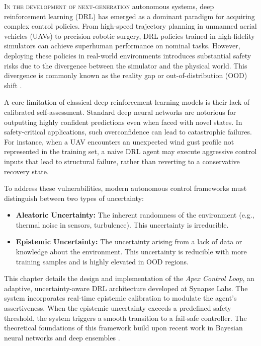 \lettrine{I}{n the development of next-generation} autonomous systems, deep reinforcement learning (DRL) has emerged as a dominant paradigm for acquiring complex control policies. From high-speed trajectory planning in unmanned aerial vehicles (UAVs) to precision robotic surgery, DRL policies trained in high-fidelity simulators can achieve superhuman performance on nominal tasks. However, deploying these policies in real-world environments introduces substantial safety risks due to the divergence between the simulator and the physical world. This divergence is commonly known as the reality gap or out-of-distribution (OOD) shift \cite{vance2025safe}.

A core limitation of classical deep reinforcement learning models is their lack of calibrated self-assessment. Standard deep neural networks are notorious for outputting highly confident predictions even when faced with novel states. In safety-critical applications, such overconfidence can lead to catastrophic failures. For instance, when a UAV encounters an unexpected wind gust profile not represented in the training set, a naive DRL agent may execute aggressive control inputs that lead to structural failure, rather than reverting to a conservative recovery state.

To address these vulnerabilities, modern autonomous control frameworks must distinguish between two types of uncertainty:
\begin{itemize}
    \item \textbf{Aleatoric Uncertainty:} The inherent randomness of the environment (e.g., thermal noise in sensors, turbulence). This uncertainty is irreducible.
    \item \textbf{Epistemic Uncertainty:} The uncertainty arising from a lack of data or knowledge about the environment. This uncertainty is reducible with more training samples and is highly elevated in OOD regions.
\end{itemize}

This chapter details the design and implementation of the \textit{Apex Control Loop}, an adaptive, uncertainty-aware DRL architecture developed at Synapse Labs. The system incorporates real-time epistemic calibration to modulate the agent's assertiveness. When the epistemic uncertainty exceeds a predefined safety threshold, the system triggers a smooth transition to a fail-safe controller. The theoretical foundations of this framework build upon recent work in Bayesian neural networks and deep ensembles \cite{chen2024epistemic}.

